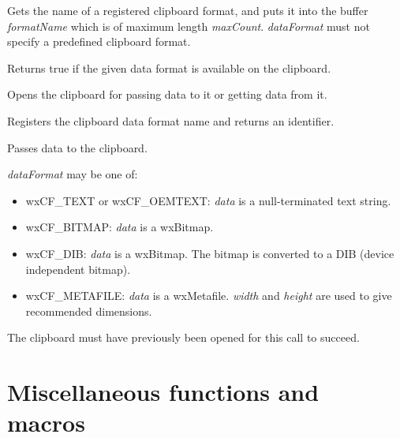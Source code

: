 Gets the name of a registered clipboard format, and puts it into the buffer {\it formatName} which is of maximum
length {\it maxCount}. {\it dataFormat} must not specify a predefined clipboard format.


\label{wxisclipboardformatavailable}


Returns true if the given data format is available on the clipboard.


\label{wxopenclipboard}


Opens the clipboard for passing data to it or getting data from it.


\label{wxregisterclipboardformat}


Registers the clipboard data format name and returns an identifier.


\label{wxsetclipboarddata}


Passes data to the clipboard.

{\it dataFormat} may be one of:

\begin{itemize}\itemsep=0pt
\item wxCF\_TEXT or wxCF\_OEMTEXT: {\it data} is a null-terminated text string.
\item wxCF\_BITMAP: {\it data} is a wxBitmap.
\item wxCF\_DIB: {\it data} is a wxBitmap. The bitmap is converted to a DIB (device independent bitmap).
\item wxCF\_METAFILE: {\it data} is a wxMetafile. {\it width} and {\it height} are used to give recommended dimensions.
\end{itemize}

The clipboard must have previously been opened for this call to succeed.


\section{Miscellaneous functions and macros}\label{miscellany}


